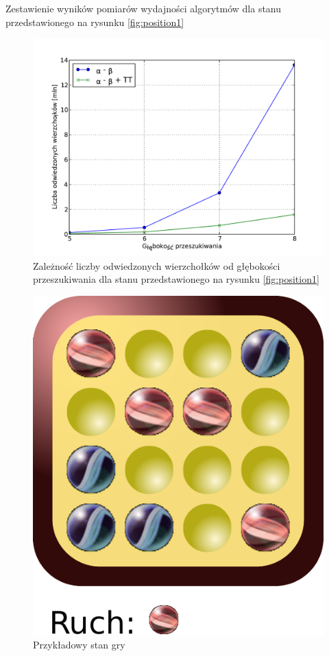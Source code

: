 \documentclass{scrartcl}
\begin{document}
\begin{table}[h]
  \centering
  \caption{Zestawienie wyników  pomiarów wydajności algorytmów dla stanu
    przedstawionego na rysunku \ref{fig:position1}}
  \label{table:position1}
  
\end{table}

\begin{figure}[h]
  \centering
  \includegraphics[scale=0.5]{data/results1.pdf}
  \caption{Zależność liczby odwiedzonych wierzchołków od głębokości
    przeszukiwania dla stanu przedstawionego na rysunku
    \ref{fig:position1}}
  \label{fig:results1}
\end{figure}

\begin{figure}[h]
  \centering
  \includegraphics[scale=0.6]{data/position2.pdf}
  \caption{Przykładowy stan gry}
  \label{fig:position2}
\end{figure}
\end{document}
